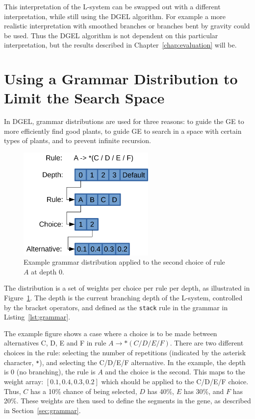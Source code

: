 This interpretation of the \gls{L-system} can be swapped out with a different interpretation, while still using the \gls{DGEL} algorithm.
For example a more realistic interpretation with smoothed branches or branches bent by gravity could be used.
Thus the \gls{DGEL} algorithm is not dependent on this particular interpretation, but the results described in Chapter~\ref{chap:evaluation} will be.

\section{Using a Grammar Distribution to Limit the Search Space}
In \gls{DGEL}, grammar distributions are used for three reasons: to guide the \gls{GE} to more efficiently find good plants, to guide \gls{GE} to search in a space with certain types of plants, and to prevent infinite recursion.

\begin{figure}
    \centering
    \includegraphics[width=0.6\textwidth]{figures/distribution}
    \caption[Example grammar distribution]{Example grammar distribution applied to the second choice of rule $A$ at depth 0.}
    \label{fig:distribution}
\end{figure}

The distribution is a set of weights per choice per rule per depth, as illustrated in Figure~\ref{fig:distribution}.
The depth is the current branching depth of the \gls{L-system}, controlled by the bracket operators, and defined as the \texttt{stack} rule in the grammar in Listing~\ref{lst:grammar}.

The example figure shows a case where a choice is to be made between alternatives C, D, E and F in rule $A \rightarrow *(C / D / E / F)$.
There are two different choices in the rule: selecting the number of repetitions (indicated by the asterisk character, \texttt{*}), and selecting the C/D/E/F alternative.
In the example, the depth is 0 (no branching), the rule is $A$ and the choice is the second.
This maps to the weight array: $[0.1, 0.4, 0.3, 0.2]$ which should be applied to the C/D/E/F choice.
Thus, $C$ has a 10\% chance of being selected, $D$ has 40\%, $E$ has 30\%, and $F$ has 20\%.
These weights are then used to define the segments in the gene, as described in Section~\ref{sec:grammar}.

